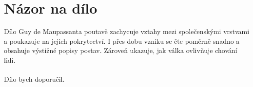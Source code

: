 \documentclass[12pt,a4paper]{article}
\begin{document}
\section*{Názor na dílo}

Dílo Guy de Maupassanta poutavě zachycuje vztahy mezi společenskými vrstvami a poukazuje na jejich pokrytectví. I přes dobu vzniku se čte poměrně snadno a obsahuje výstižné popisy postav. Zároveň ukazuje, jak válka ovlivňuje chování lidí.\\
\\
Dílo bych doporučil.
\end{document}
